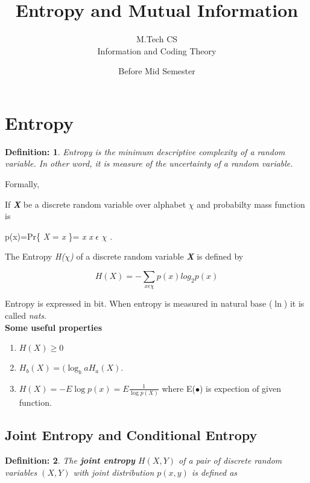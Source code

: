 \documentclass[11pt]{article}
\newtheorem{defn}{Definition:}
\begin{document}
\title{Entropy and Mutual Information}
\author{M.Tech CS\\
 Information and Coding Theory}
\date {Before Mid Semester}
\maketitle
\section{Entropy}
\begin{defn}
Entropy is the minimum descriptive complexity of a random variable. In other word, it is measure of the uncertainty of a random variable.
\end{defn}
Formally,

If \textbf{ \textit{X}} be a discrete random variable over alphabet $\chi$ and probabilty mass function is
 
p(x)=Pr\{ {\textit{X} = \textit{x} \}= \textit{x}} \textit{x} $\epsilon$ \textbf{\textit{$\chi$} }.

The Entropy \textit{H($\chi$)} of a discrete random variable \textbf{ \textit{X}} is defined by 

\begin{equation}
H(X) = - \sum \limits_{x \epsilon \chi} p(x) log_{2} p(x)
\end{equation}


Entropy is expressed in bit. 
When entropy is measured in natural base ($\ln$) it is called \textit{nats}.\\
\textbf{Some useful properties}
\begin{enumerate}
	

\item $H(X) \geq 0$
\item $H_{b}(X)=(\log_{b} a H_{a} (X).$
\item $H(X)=-E\log p(x) = E \frac{1}{\log p(X)}$ where E($\bullet$) is expection of given function.

\end{enumerate}

\subsection{Joint Entropy and Conditional Entropy}

\begin{defn}
The \textbf{joint entropy } $H(X,Y)$ of a pair of discrete random variables $(X,Y)$ with joint distribution $p(x,y)$ is defined as 
\end{defn}
\end{document}
